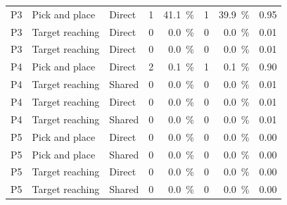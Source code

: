 \begin{table}[htbp]
\begin{tabular}{@{}lllrrrrr@{}}
    P3 & Pick and place & Direct & 1 & \SI{41.1}{\percent} & 1 & \SI{39.9}{\percent} & 0.95 \\
    P3 & Target reaching & Direct & 0 & \SI{0.0}{\percent} & 0 & \SI{0.0}{\percent} & 0.01 \\
    P3 & Target reaching & Direct & 0 & \SI{0.0}{\percent} & 0 & \SI{0.0}{\percent} & 0.01 \\
    P4 & Pick and place & Direct & 2 & \SI{0.1}{\percent} & 1 & \SI{0.1}{\percent} & 0.90 \\
    P4 & Target reaching & Shared & 0 & \SI{0.0}{\percent} & 0 & \SI{0.0}{\percent} & 0.01 \\
    P4 & Target reaching & Direct & 0 & \SI{0.0}{\percent} & 0 & \SI{0.0}{\percent} & 0.01 \\
    P4 & Target reaching & Shared & 0 & \SI{0.0}{\percent} & 0 & \SI{0.0}{\percent} & 0.01 \\
    P5 & Pick and place & Direct & 0 & \SI{0.0}{\percent} & 0 & \SI{0.0}{\percent} & 0.00 \\
    P5 & Pick and place & Shared & 0 & \SI{0.0}{\percent} & 0 & \SI{0.0}{\percent} & 0.00 \\
    P5 & Target reaching & Direct & 0 & \SI{0.0}{\percent} & 0 & \SI{0.0}{\percent} & 0.00 \\
    P5 & Target reaching & Shared & 0 & \SI{0.0}{\percent} & 0 & \SI{0.0}{\percent} & 0.00 \\
    \bottomrule
  \end{tabular}
\end{table}
